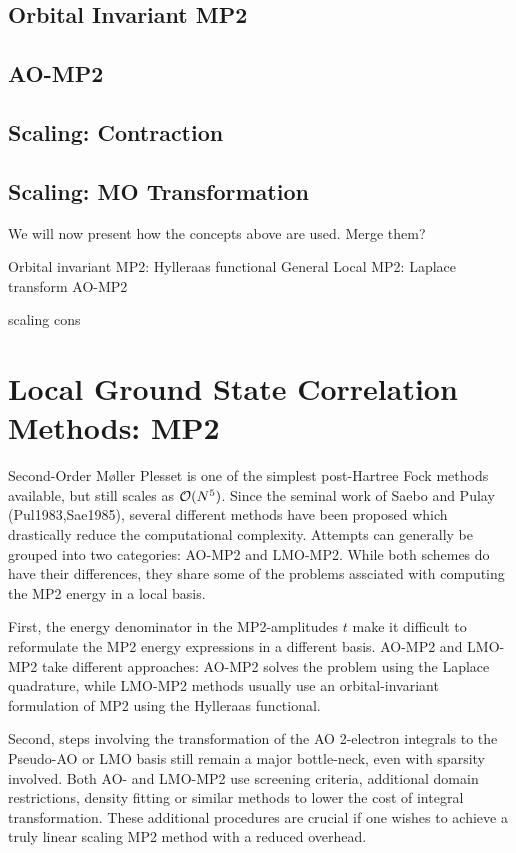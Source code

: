 \subsection{Orbital Invariant MP2}

\subsection{AO-MP2}

\subsection{Scaling: Contraction}

\subsection{Scaling: MO Transformation}

We will now present how the concepts above are used. Merge them?

Orbital invariant MP2: Hylleraas functional
General Local MP2: Laplace transform
AO-MP2

scaling cons 

\newpage

\section{Local Ground State Correlation Methods: MP2}

Second-Order M{\o}ller Plesset is one of the simplest post-Hartree Fock methods available, but still scales as $\mathcal{O}(N^{5})$. Since the seminal work of Saebo and Pulay (Pul1983,Sae1985), several different methods have been proposed which drastically reduce the computational complexity. Attempts can generally be grouped into two categories: AO-MP2 and LMO-MP2. While both schemes do have their differences, they share some of the problems assciated with computing the MP2 energy in a local basis.

First, the energy denominator in the MP2-amplitudes $t$ make it difficult to reformulate the MP2 energy expressions in a different basis. AO-MP2 and LMO-MP2 take different approaches: AO-MP2 solves the problem using the Laplace quadrature, while LMO-MP2 methods usually use an orbital-invariant formulation of MP2 using the Hylleraas functional.

Second, steps involving the transformation of the AO 2-electron integrals to the Pseudo-AO or LMO basis still remain a major bottle-neck, even with sparsity involved. Both AO- and LMO-MP2 use screening criteria, additional domain restrictions, density fitting or similar methods to lower the cost of integral transformation. These additional procedures are crucial if one wishes to achieve a truly linear scaling MP2 method with a reduced overhead.

